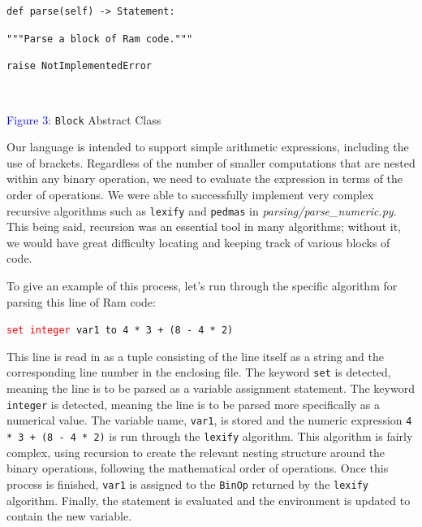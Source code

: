 \documentclass[fontsize=11pt]{article}
\newcommand{\red}[1]{\textcolor{red}{#1}}
\begin{document}
\quad\quad{\texttt{\textcolor{commentblue}{"""}}}

\quad\quad\texttt{\textcolor{keywordred}{def} \textcolor{keywordpurple}{parse}(self) -> Statement:}

\quad\quad\texttt{"""Parse a block of Ram code."""}

\quad\quad \quad\quad \texttt{\textcolor{keywordred}{raise} \textcolor{keywordorange}{NotImplementedError}}

$ $
\begin{center}

    \small{\textcolor{blue}{Figure 3}: \texttt{Block} Abstract Class}
\end{center}

Our language is intended to support simple arithmetic expressions, including the use of brackets. Regardless of the number of smaller computations that are nested within any binary operation, we need to evaluate the expression in terms of the order of operations. We were able to successfully implement very complex recursive algorithms such as \texttt{lexify} and \texttt{pedmas} in \textit{parsing/parse\_numeric.py}. This being said, recursion was an essential tool in many algorithms; without it, we would have great difficulty locating and keeping track of various blocks of code.

To give an example of this process, let's run through the specific algorithm for parsing this line of Ram code:

\begin{center}
    \texttt{\red{set integer} var1 to 4 * 3 + (8 - 4 * 2)}
\end{center}

This line is read in as a tuple consisting of the line itself as a string and the corresponding line number in the enclosing file. The keyword \texttt{set} is detected, meaning the line is to be parsed as a variable assignment statement. The keyword \texttt{integer} is detected, meaning the line is to be parsed more specifically as a numerical value. The variable name, \texttt{var1}, is stored and the numeric expression \texttt{4 * 3 + (8 - 4 * 2)} is run through the \texttt{lexify} algorithm. This algorithm is fairly complex, using recursion to create the relevant nesting structure around the binary operations, following the mathematical order of operations. Once this process is finished, \texttt{var1} is assigned to the \texttt{BinOp} returned by the \texttt{lexify} algorithm. Finally, the statement is evaluated and the environment is updated to contain the new variable.
\end{document}

